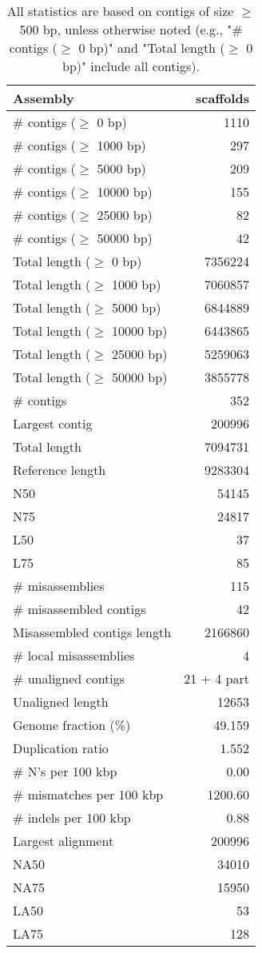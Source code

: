 \documentclass[12pt,a4paper]{article}
\begin{document}
\begin{table}[ht]
\begin{center}
\caption{All statistics are based on contigs of size $\geq$ 500 bp, unless otherwise noted (e.g., "\# contigs ($\geq$ 0 bp)" and "Total length ($\geq$ 0 bp)" include all contigs).}
\begin{tabular}{|l*{1}{|r}|}
\hline
Assembly & scaffolds \\ \hline
\# contigs ($\geq$ 0 bp) & 1110 \\ \hline
\# contigs ($\geq$ 1000 bp) & 297 \\ \hline
\# contigs ($\geq$ 5000 bp) & 209 \\ \hline
\# contigs ($\geq$ 10000 bp) & 155 \\ \hline
\# contigs ($\geq$ 25000 bp) & 82 \\ \hline
\# contigs ($\geq$ 50000 bp) & 42 \\ \hline
Total length ($\geq$ 0 bp) & 7356224 \\ \hline
Total length ($\geq$ 1000 bp) & 7060857 \\ \hline
Total length ($\geq$ 5000 bp) & 6844889 \\ \hline
Total length ($\geq$ 10000 bp) & 6443865 \\ \hline
Total length ($\geq$ 25000 bp) & 5259063 \\ \hline
Total length ($\geq$ 50000 bp) & 3855778 \\ \hline
\# contigs & 352 \\ \hline
Largest contig & 200996 \\ \hline
Total length & 7094731 \\ \hline
Reference length & 9283304 \\ \hline
N50 & 54145 \\ \hline
N75 & 24817 \\ \hline
L50 & 37 \\ \hline
L75 & 85 \\ \hline
\# misassemblies & 115 \\ \hline
\# misassembled contigs & 42 \\ \hline
Misassembled contigs length & 2166860 \\ \hline
\# local misassemblies & 4 \\ \hline
\# unaligned contigs & 21 + 4 part \\ \hline
Unaligned length & 12653 \\ \hline
Genome fraction (\%) & 49.159 \\ \hline
Duplication ratio & 1.552 \\ \hline
\# N's per 100 kbp & 0.00 \\ \hline
\# mismatches per 100 kbp & 1200.60 \\ \hline
\# indels per 100 kbp & 0.88 \\ \hline
Largest alignment & 200996 \\ \hline
NA50 & 34010 \\ \hline
NA75 & 15950 \\ \hline
LA50 & 53 \\ \hline
LA75 & 128 \\ \hline
\end{tabular}
\end{center}
\end{table}
\end{document}
